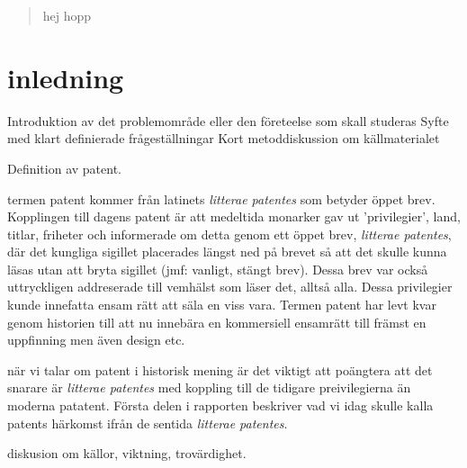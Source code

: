 \begin{abstract}
	hej hopp
\end{abstract}	
	
	
\section{inledning}	
Introduktion av det problemområde eller den företeelse som skall studeras
Syfte med klart definierade frågeställningar
Kort metoddiskussion om källmaterialet

Definition av patent.

termen patent kommer från latinets \emph{litterae patentes} som betyder öppet brev. Kopplingen till dagens patent är att medeltida monarker gav ut 'privilegier', land, titlar, friheter och informerade om detta genom ett öppet brev, \emph{litterae patentes}, där det kungliga sigillet placerades längst ned på brevet så att det skulle kunna läsas utan att bryta sigillet (jmf: vanligt, stängt brev). Dessa brev var också uttryckligen addreserade till vemhälst som läser det, alltså alla. Dessa privilegier kunde innefatta ensam rätt att säla en viss vara. Termen patent har levt kvar genom historien till att nu innebära en kommersiell ensamrätt till främst en uppfinning men även design etc. \cite{blackstone}

när vi talar om patent i historisk mening är det viktigt att poängtera att det snarare är \emph{litterae patentes} med koppling till de tidigare preivilegierna än moderna patatent. Första delen i rapporten beskriver vad vi idag skulle kalla patents härkomst ifrån de sentida \emph{litterae patentes}.

diskusion om källor, viktning, trovärdighet.

